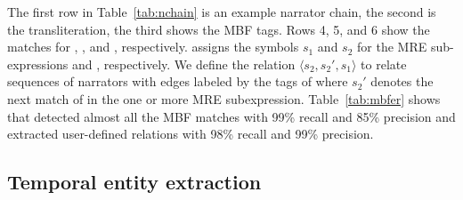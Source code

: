 The first row in Table~\ref{tab:nchain} is an example narrator chain,
the second is the transliteration, the third 
shows the MBF tags. Rows 4, 5, and 6 show the 
matches for , , and ,
respectively.
%
\framework assigns the symbols $s_1$ and $s_2$ for the 
MRE sub-expressions  and , respectively. 
We define the relation $\langle s_2,s_2',s_1\rangle$ 
to relate sequences of narrators with edges labeled by the tags of  where 
$s_2'$ denotes the next match of  in the one or more MRE subexpression.
%
Table~\ref{tab:mbfer} shows that \framework detected almost all the MBF matches 
with 99\% recall and 85\% precision and 
extracted user-defined relations with 98\% recall and 99\% precision.


\begin{table}[tb]
  \centering
  \caption{\label{tab:mbfer}\framework MBF and user-defined relation accuracy.}
 \vspace{-1.5em}
\end{table}%

\vspace{-1.5em}
\subsection{Temporal entity extraction}
\vspace{-1em}

